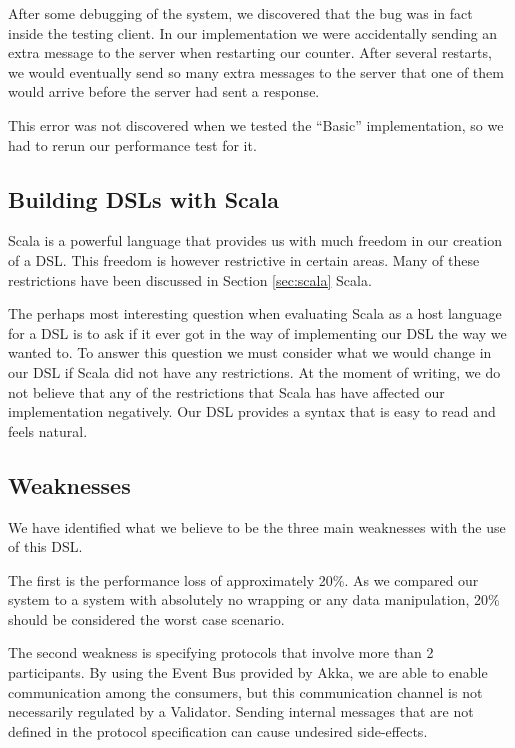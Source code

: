 After some debugging of the system, we discovered that the bug was in fact inside the testing client. In our implementation we were accidentally sending an extra message to the server when restarting our counter. After several restarts, we would eventually send so many extra messages to the server that one of them would arrive before the server had sent a response.

This error was not discovered when we tested the ``Basic'' implementation, so we had to rerun our performance test for it.


\subsection{Building DSLs with Scala}
Scala is a powerful language that provides us with much freedom in our creation of a DSL. This freedom is however restrictive in certain areas. Many of these restrictions have been discussed in Section \ref{sec:scala} Scala.
 
The perhaps most interesting question when evaluating Scala as a host language for a DSL is to ask if it ever got in the way of implementing our DSL the way we wanted to. To answer this question we must consider what we would change in our DSL if Scala did not have any restrictions. At the moment of writing, we do not believe that any of the restrictions that Scala has have affected our implementation negatively. Our DSL provides a syntax that is easy to read and feels natural.


\subsection{Weaknesses}
We have identified what we believe to be the three main weaknesses with the use of this DSL. 

The first is the performance loss of approximately 20\%. As we compared our system to a system with absolutely no wrapping or any data manipulation, 20\% should be considered the worst case scenario. 

The second weakness is specifying protocols that involve more than 2 participants. By using the Event Bus provided by Akka, we are able to enable communication among the consumers, but this communication channel is not necessarily regulated by a Validator. Sending internal messages that are not defined in the protocol specification can cause undesired side-effects. 

